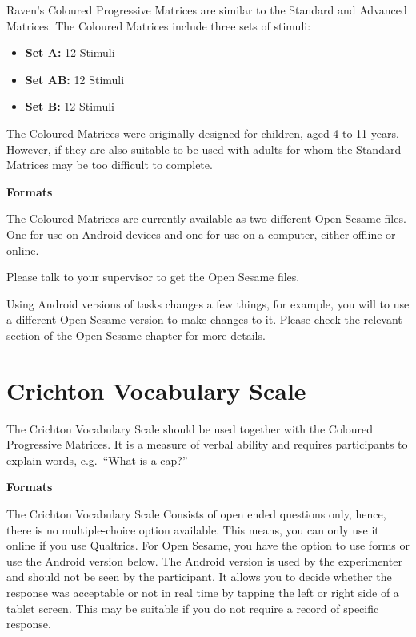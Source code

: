 \documentclass[
]{book}
\providecommand{\tightlist}{%
  \setlength{\itemsep}{0pt}\setlength{\parskip}{0pt}}
\begin{document}
Raven's Coloured Progressive Matrices are similar to the Standard and Advanced Matrices. The Coloured Matrices include three sets of stimuli:

\begin{itemize}
\tightlist
\item
  \textbf{Set A:} 12 Stimuli
\item
  \textbf{Set AB:} 12 Stimuli
\item
  \textbf{Set B:} 12 Stimuli
\end{itemize}

The Coloured Matrices were originally designed for children, aged 4 to 11 years. However, if they are also suitable to be used with adults for whom the Standard Matrices may be too difficult to complete.

\textbf{Formats}

The Coloured Matrices are currently available as two different Open Sesame files. One for use on Android devices and one for use on a computer, either offline or online.

Please talk to your supervisor to get the Open Sesame files.

Using Android versions of tasks changes a few things, for example, you will to use a different Open Sesame version to make changes to it. Please check the relevant section of the Open Sesame chapter for more details.

\hypertarget{crichton-vocabulary-scale}{%
\section{Crichton Vocabulary Scale}\label{crichton-vocabulary-scale}}

The Crichton Vocabulary Scale should be used together with the Coloured Progressive Matrices. It is a measure of verbal ability and requires participants to explain words, e.g.~``What is a cap?''

\textbf{Formats}

The Crichton Vocabulary Scale Consists of open ended questions only, hence, there is no multiple-choice option available. This means, you can only use it online if you use Qualtrics. For Open Sesame, you have the option to use forms or use the Android version below.
The Android version is used by the experimenter and should not be seen by the participant. It allows you to decide whether the response was acceptable or not in real time by tapping the left or right side of a tablet screen. This may be suitable if you do not require a record of specific response.
\end{document}
